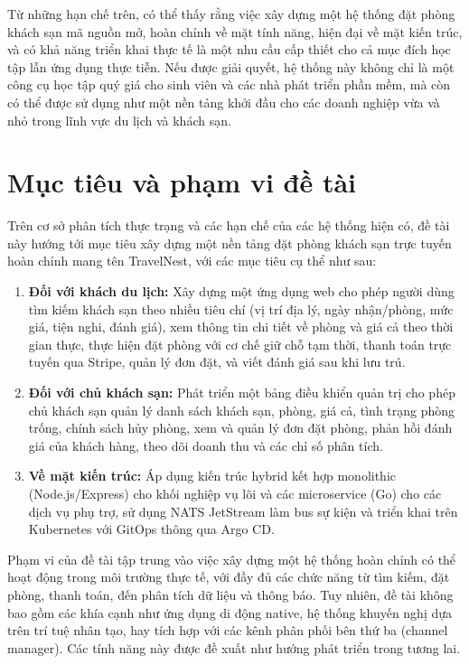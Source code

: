 \documentclass[13pt,a4paper,twoside]{report}
\begin{document}
Từ những hạn chế trên, có thể thấy rằng việc xây dựng một hệ thống đặt phòng khách sạn mã nguồn mở, hoàn chỉnh về mặt tính năng, hiện đại về mặt kiến trúc, và có khả năng triển khai thực tế là một nhu cầu cấp thiết cho cả mục đích học tập lẫn ứng dụng thực tiễn. Nếu được giải quyết, hệ thống này không chỉ là một công cụ học tập quý giá cho sinh viên và các nhà phát triển phần mềm, mà còn có thể được sử dụng như một nền tảng khởi đầu cho các doanh nghiệp vừa và nhỏ trong lĩnh vực du lịch và khách sạn.

\section{Mục tiêu và phạm vi đề tài}

Trên cơ sở phân tích thực trạng và các hạn chế của các hệ thống hiện có, đề tài này hướng tới mục tiêu xây dựng một nền tảng đặt phòng khách sạn trực tuyến hoàn chỉnh mang tên TravelNest, với các mục tiêu cụ thể như sau:

\begin{enumerate}
  \item \textbf{Đối với khách du lịch:} Xây dựng một ứng dụng web cho phép người dùng tìm kiếm khách sạn theo nhiều tiêu chí (vị trí địa lý, ngày nhận/phòng, mức giá, tiện nghi, đánh giá), xem thông tin chi tiết về phòng và giá cả theo thời gian thực, thực hiện đặt phòng với cơ chế giữ chỗ tạm thời, thanh toán trực tuyến qua Stripe, quản lý đơn đặt, và viết đánh giá sau khi lưu trú.
  \item \textbf{Đối với chủ khách sạn:} Phát triển một bảng điều khiển quản trị cho phép chủ khách sạn quản lý danh sách khách sạn, phòng, giá cả, tình trạng phòng trống, chính sách hủy phòng, xem và quản lý đơn đặt phòng, phản hồi đánh giá của khách hàng, theo dõi doanh thu và các chỉ số phân tích.
  \item \textbf{Về mặt kiến trúc:} Áp dụng kiến trúc hybrid kết hợp monolithic (Node.js/Express) cho khối nghiệp vụ lõi và các microservice (Go) cho các dịch vụ phụ trợ, sử dụng NATS JetStream làm bus sự kiện và triển khai trên Kubernetes với GitOps thông qua Argo CD.
\end{enumerate}

Phạm vi của đề tài tập trung vào việc xây dựng một hệ thống hoàn chỉnh có thể hoạt động trong môi trường thực tế, với đầy đủ các chức năng từ tìm kiếm, đặt phòng, thanh toán, đến phân tích dữ liệu và thông báo. Tuy nhiên, đề tài không bao gồm các khía cạnh như ứng dụng di động native, hệ thống khuyến nghị dựa trên trí tuệ nhân tạo, hay tích hợp với các kênh phân phối bên thứ ba (channel manager). Các tính năng này được đề xuất như hướng phát triển trong tương lai.
\end{document}
